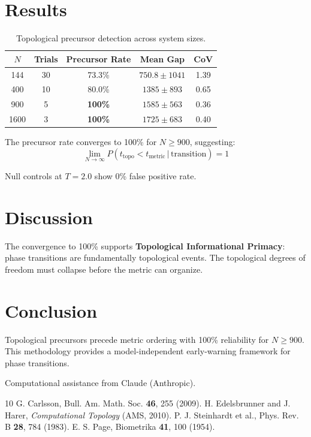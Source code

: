 \documentclass[aps,pre,twocolumn,superscriptaddress]{revtex4-2}
\begin{document}
\section{Results}

\begin{table}[h]
\caption{Topological precursor detection across system sizes.}
\label{tab:results}
\begin{ruledtabular}
\begin{tabular}{ccccc}
$N$ & Trials & Precursor Rate & Mean Gap & CoV \\
\hline
144 & 30 & 73.3\% & $750.8 \pm 1041$ & 1.39 \\
400 & 10 & 80.0\% & $1385 \pm 893$ & 0.65 \\
900 & 5 & \textbf{100\%} & $1585 \pm 563$ & 0.36 \\
1600 & 3 & \textbf{100\%} & $1725 \pm 683$ & 0.40 \\
\end{tabular}
\end{ruledtabular}
\end{table}

The precursor rate converges to 100\% for $N \geq 900$, suggesting:
\begin{equation}
\lim_{N \to \infty} P(t_{\text{topo}} < t_{\text{metric}} \,|\, \text{transition}) = 1
\end{equation}

Null controls at $T = 2.0$ show 0\% false positive rate.

\section{Discussion}

The convergence to 100\% supports \textbf{Topological Informational Primacy}: phase transitions are fundamentally topological events. The topological degrees of freedom must collapse before the metric can organize.

\section{Conclusion}

Topological precursors precede metric ordering with 100\% reliability for $N \geq 900$. This methodology provides a model-independent early-warning framework for phase transitions.

\begin{acknowledgments}
Computational assistance from Claude (Anthropic).
\end{acknowledgments}

\begin{thebibliography}{10}
 G. Carlsson, Bull. Am. Math. Soc. \textbf{46}, 255 (2009).
 H. Edelsbrunner and J. Harer, \textit{Computational Topology} (AMS, 2010).
 P. J. Steinhardt et al., Phys. Rev. B \textbf{28}, 784 (1983).
 E. S. Page, Biometrika \textbf{41}, 100 (1954).
\end{thebibliography}
\end{document}
